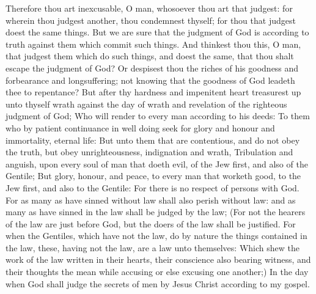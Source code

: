  Therefore thou art inexcusable, O man, whosoever thou art
that judgest: for wherein thou judgest another, thou condemnest thyself;
for thou that judgest doest the same things.  But we are
sure that the judgment of God is according to truth against them which
commit such things.  And thinkest thou this, O man, that
judgest them which do such things, and doest the same, that thou shalt
escape the judgment of God?  Or despisest thou the riches
of his goodness and forbearance and longsuffering; not knowing that the
goodness of God leadeth thee to repentance?  But after thy
hardness and impenitent heart treasurest up unto thyself wrath against
the day of wrath and revelation of the righteous judgment of God;
 Who will render to every man according to his deeds:
 To them who by patient continuance in well doing seek for
glory and honour and immortality, eternal life:  But unto
them that are contentious, and do not obey the truth, but obey
unrighteousness, indignation and wrath,  Tribulation and
anguish, upon every soul of man that doeth evil, of the Jew first, and
also of the Gentile;  But glory, honour, and peace, to
every man that worketh good, to the Jew first, and also to the Gentile:
 For there is no respect of persons with God.
 For as many as have sinned without law shall also perish
without law: and as many as have sinned in the law shall be judged by
the law;  (For not the hearers of the law are just before
God, but the doers of the law shall be justified.  For
when the Gentiles, which have not the law, do by nature the things
contained in the law, these, having not the law, are a law unto
themselves:  Which shew the work of the law written in
their hearts, their conscience also bearing witness, and their thoughts
the mean while accusing or else excusing one another;) 
In the day when God shall judge the secrets of men by Jesus Christ
according to my gospel.

